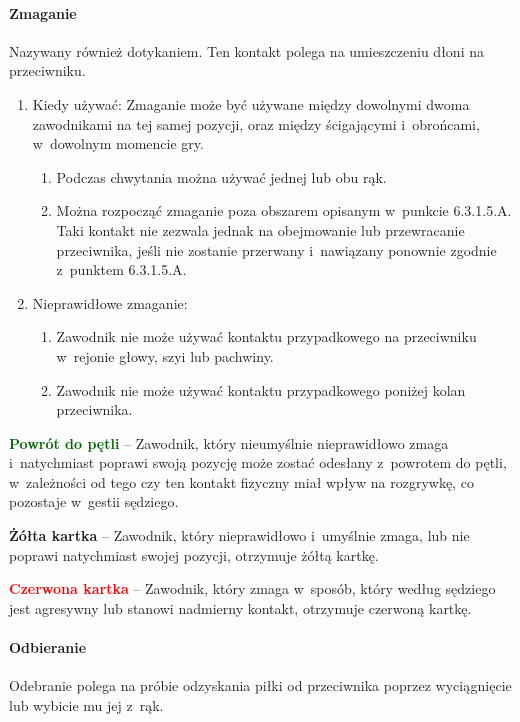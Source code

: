 \documentclass[12pt,a4paper]{article}
\newcommand\redcard[1]{\bgroup\textcolor{red}{\textbf{#1}}}
\newcommand\yellowcard[1]{\bgroup\textcolor{darkyellow}{\textbf{#1}}}
\newcommand\other[1]{\bgroup\textcolor{darkgreen}{\textbf{#1}}}
\begin{document}
\paragraph{Zmaganie}
Nazywany również dotykaniem. Ten kontakt
polega na umieszczeniu dłoni na przeciwniku.

\begin{enumerate}
	\item
	      Kiedy używać: Zmaganie może być używane między dowolnymi dwoma
	      zawodnikami na tej samej pozycji, oraz między ścigającymi i~obrońcami,
	      w~dowolnym momencie gry.

	      \begin{enumerate}
		      \item
		            Podczas chwytania można używać jednej lub obu rąk.
		      \item
		            Można rozpocząć zmaganie poza obszarem opisanym w~punkcie
		            6.3.1.5.A. Taki kontakt nie zezwala jednak na obejmowanie lub
		            przewracanie przeciwnika, jeśli nie zostanie przerwany i~nawiązany
		            ponownie zgodnie z~punktem 6.3.1.5.A.
	      \end{enumerate}
	\item
	      Nieprawidłowe zmaganie:

	      \begin{enumerate}
		      \item
		            Zawodnik nie może używać kontaktu przypadkowego na przeciwniku w~rejonie głowy, szyi lub pachwiny.
		      \item
		            Zawodnik nie może używać kontaktu przypadkowego poniżej kolan
		            przeciwnika.
	      \end{enumerate}
\end{enumerate}

\other{Powrót do pętli} -- Zawodnik, który nieumyślnie nieprawidłowo
zmaga i~natychmiast poprawi swoją pozycję może zostać odesłany z~powrotem do pętli, w~zależności od tego czy ten kontakt fizyczny miał
wpływ na rozgrywkę, co pozostaje w~gestii sędziego.

\yellowcard{Żółta kartka} -- Zawodnik, który nieprawidłowo i~umyślnie zmaga,
lub nie poprawi natychmiast swojej pozycji, otrzymuje żółtą kartkę.

\redcard{Czerwona kartka} -- Zawodnik, który zmaga w~sposób, który według
sędziego jest agresywny lub stanowi nadmierny kontakt, otrzymuje
czerwoną kartkę.

\paragraph{Odbieranie}
Odebranie polega na próbie odzyskania
piłki od przeciwnika poprzez wyciągnięcie lub wybicie mu jej z~rąk.
\end{document}
